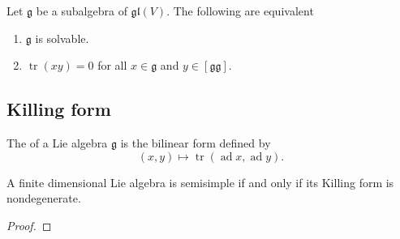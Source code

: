 \documentclass{article}
\newcommand{\lb}[1]{\ensuremath{\left[{#1}\right]}}
\DeclareMathOperator{\tr}{tr}
\DeclareMathOperator{\ad}{ad}
\newcommand*\frkg{{\ensuremath{\mathfrak{g}}}}
\newcommand*\glalg{\ensuremath{\mathfrak{gl}}}
\begin{document}
\begin{theorem}
    Let $\frkg$ be a subalgebra of $\glalg(V)$.
    The following are equivalent
    \begin{enumerate}[label=(\alph*)]
        \item
            $\frkg$ is solvable.
        \item 
            $\tr(xy) = 0$ for all $x \in \frkg$ and $y \in \lb{\frkg\frkg}$.
    \end{enumerate}
\end{theorem}

\subsection{Killing form}

\begin{definition}
    The  of a Lie algebra $\frkg$ is the bilinear form defined by
    \[
        (x, y)
        \mapsto
        \tr(\ad x, \ad y).
    \]
\end{definition}

\begin{proposition}
    A finite dimensional Lie algebra is semisimple if and only if its Killing form is nondegenerate.
\end{proposition}

\begin{proof}
\end{proof}
\end{document}
